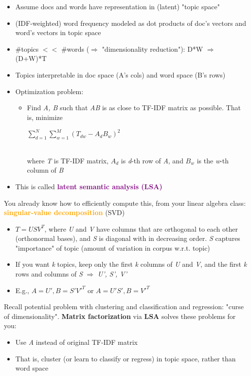 \documentclass[11pt]{article}
\begin{document}
\begin{itemize}
	\item Assume docs and words have representation in (latent) "topic space"
	\item (IDF-weighted) word frequency modeled as dot products of doc's vectors and word's vectors in topic space
	\item \#topics $<<$ \#words ($\Rightarrow$ "dimensionality reduction"): D*W $\Rightarrow$ (D+W)*T
	\item Topics interpretable in doc space (A's cols) and word space (B's rows)
	\item Optimization problem: 
		\begin{itemize}
			\item Find \textit{A, B} such that \textit{AB} is as close to TF-IDF matrix as possible. That is, minimize 
			\begin{center}
				$\sum\limits_{d=1}^{N} \sum\limits_{w=1}^{M} (T_{dw} - A_d B_w)^{2}$
		\end{center}\\
		where \textit{T} is TF-IDF matrix, $A_d$ is \textit{d}-th row of \textit{A}, and $B_w$ is the \textit{w}-th column of \textit{B}
		\end{itemize}
	\item This is called \textbf{\textcolor{purple}{latent semantic analysis (LSA)}}
\end{itemize}

You already know how to efficiently compute this, from your linear algebra class: \textbf{\textcolor{orange}{singular-value decomposition}} (SVD)
\begin{itemize}
	\item $T = USV^{T}$, where \textit{U} and \textit{V} have columns that are orthogonal to each other (orthonormal bases), and \textit{S} is diagonal with in decreasing order. \textit{S} captures "importance" of topic (amount of variation in corpus w.r.t. topic)
	\item If you want \textit{k} topics, keep only the first \textit{k} columns of \textit{U} and \textit{V}, and the first \textit{k} rows and columns of \textit{S} $\Rightarrow$ \textit{U', S', V'}
	\item E.g., $A = U', B = S'V'^{T}$ or $A = U'S', B = V'^{T}$
\end{itemize}

Recall potential problem with clustering and classification and regression: "curse of dimensionality". \textbf{Matrix factorization} via \textbf{LSA} solves these problems for you: 
\begin{itemize}
	\item Use \textit{A} instead of original TF-IDF matrix
	\item That is, cluster (or learn to classify or regress) in topic space, rather than word space
\end{itemize}
\end{document}
